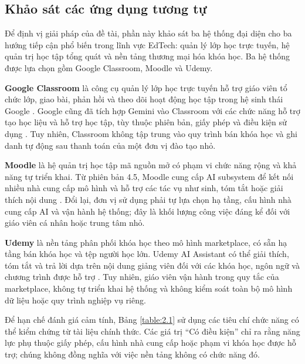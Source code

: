 ﻿\documentclass[../DoAn.tex]{subfiles}
\begin{document}
\subsection{Khảo sát các ứng dụng tương tự}
\label{subsection:2.1.3}

Để định vị giải pháp của đề tài, phần này khảo sát ba hệ thống đại diện cho ba hướng tiếp cận phổ biến trong lĩnh vực EdTech: quản lý lớp học trực tuyến, hệ quản trị học tập tổng quát và nền tảng thương mại hóa khóa học. Ba hệ thống được lựa chọn gồm Google Classroom, Moodle và Udemy.

\textbf{Google Classroom} là công cụ quản lý lớp học trực tuyến hỗ trợ giáo viên tổ chức lớp, giao bài, phản hồi và theo dõi hoạt động học tập trong hệ sinh thái Google \cite{classroom_web}. Google cũng đã tích hợp Gemini vào Classroom với các chức năng hỗ trợ tạo học liệu và hỗ trợ học tập, tùy thuộc phiên bản, giấy phép và điều kiện sử dụng \cite{classroom_gemini}. Tuy nhiên, Classroom không tập trung vào quy trình bán khóa học và ghi danh tự động sau thanh toán của một đơn vị đào tạo nhỏ.

\textbf{Moodle} là hệ quản trị học tập mã nguồn mở có phạm vi chức năng rộng và khả năng tự triển khai. Từ phiên bản 4.5, Moodle cung cấp AI subsystem để kết nối nhiều nhà cung cấp mô hình và hỗ trợ các tác vụ như sinh, tóm tắt hoặc giải thích nội dung \cite{moodle_web}. Đổi lại, đơn vị sử dụng phải tự lựa chọn hạ tầng, cấu hình nhà cung cấp AI và vận hành hệ thống; đây là khối lượng công việc đáng kể đối với giáo viên cá nhân hoặc trung tâm nhỏ.

\textbf{Udemy} là nền tảng phân phối khóa học theo mô hình marketplace, có sẵn hạ tầng bán khóa học và tệp người học lớn. Udemy AI Assistant có thể giải thích, tóm tắt và trả lời dựa trên nội dung giảng viên đối với các khóa học, ngôn ngữ và chương trình được hỗ trợ \cite{udemy_web}. Tuy nhiên, giáo viên vận hành trong quy tắc của marketplace, không tự triển khai hệ thống và không kiểm soát toàn bộ mô hình dữ liệu hoặc quy trình nghiệp vụ riêng.

Để hạn chế đánh giá cảm tính, Bảng \ref{table:2.1} sử dụng các tiêu chí chức năng có thể kiểm chứng từ tài liệu chính thức. Các giá trị ``Có điều kiện'' chỉ ra rằng năng lực phụ thuộc giấy phép, cấu hình nhà cung cấp hoặc phạm vi khóa học được hỗ trợ; chúng không đồng nghĩa với việc nền tảng không có chức năng đó.
\end{document}
